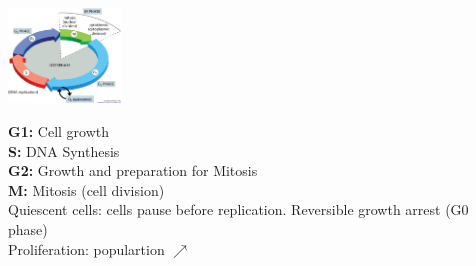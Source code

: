 \begin{minipage}{0.45\linewidth}
    \includegraphics[width=30mm]{src/Images/cell_cycle.png}
\end{minipage}
\begin{minipage}{0.45\linewidth}
    \textbf{G1:} Cell growth \\
    \textbf{S:} DNA Synthesis \\
    \textbf{G2:} Growth and preparation for Mitosis \\
    \textbf{M:} Mitosis (cell division) \\
    Quiescent cells: cells pause before replication. Reversible growth arrest (G0 phase) \\
    Proliferation: populartion $\nearrow$ 
\end{minipage}